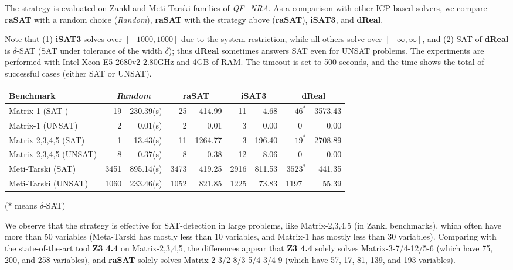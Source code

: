 \documentclass[runningheads,a4paper,oribibl]{llncs}
\begin{document}
The strategy is evaluated on Zankl and Meti-Tarski families of \emph{QF\_NRA}.
As a comparison with other ICP-based solvers, we compare
{\bf raSAT} with a random choice ({\em Random}), {\bf raSAT} with the strategy above
({\bf raSAT}), {\bf iSAT3}, and {\bf dReal}.

Note that (1) {\bf iSAT3} solves over $[-1000,1000]$ due to the system restriction,
while all others solve over $[-\infty, \infty]$, and (2) SAT of {\bf dReal} is 
$\delta$-SAT (SAT under tolerance of the width $\delta$); thus {\bf dReal} sometimes
answers SAT even for UNSAT problems. 
The experiments are performed with Intel Xeon E5-2680v2 2.80GHz and 4GB of RAM.
The timeout is set to 500 seconds, and the time shows the total of successful cases 
(either SAT or UNSAT). %


\begin{center}
\begin{tabular}{ | l | r | r | r | r | r | r | r | r |}
\hline
    \multicolumn{1}{|l|}{Benchmark} & \multicolumn{2}{c|}{\em Random} &
    \multicolumn{2}{c|}{\bf raSAT}  & \multicolumn{2}{c|}{\bf iSAT3}  &
    \multicolumn{2}{c|}{\bf dReal} \\
\hline
Matrix-1 (SAT ) & 19 & 230.39(s) & 25 & 414.99 & 11 & 4.68 & $\text{46}^{\ast}$ & 3573.43 
\\
\hline
Matrix-1 (UNSAT) & 2 & 0.01(s) & 2 & 0.01 & 3 & 0.00 & 0~ & 0.00 
\\
\hline
Matrix-2,3,4,5 (SAT) & 1 & 13.43(s) & 11 & 1264.77 & 3 & 196.40 & $\text{19}^{\ast}$ & 2708.89
\\
\hline
Matrix-2,3,4,5 (UNSAT) & 8 & 0.37(s) & 8 & 0.38 & 12 & 8.06 & 0~ & 0.00 
\\
\hline
Meti-Tarski (SAT) & 3451 & 895.14(s) & 3473 & 419.25 & 2916 & 811.53 & $\text{3523}^{\ast}$ &
441.35 
\\
\hline
Meti-Tarski (UNSAT) & 1060 & 233.46(s) & 1052 & 821.85 & 1225 & 73.83 & 1197~ & 55.39 
\\
\hline
\end{tabular}

\hfill {($\ast$ means $\delta$-SAT)} 
\end{center}

We observe that the strategy is effective for SAT-detection in large problems, like
Matrix-2,3,4,5 (in Zankl benchmarks), which often have more than 50 variables
(Meta-Tarski has mostly less than 10 variables, and Matrix-1 has mostly less than
30 variables). 
Comparing with the state-of-the-art tool {\bf Z3 4.4} on Matrix-2,3,4,5,
the differences appear that 
{\bf Z3 4.4} solely solves Matrix-3-7/4-12/5-6 (which have 75, 200, and 258 variables),
and 
{\bf raSAT} solely solves Matrix-2-3/2-8/3-5/4-3/4-9 (which have 57, 17, 81, 139, and 193
variables). 
\end{document}
